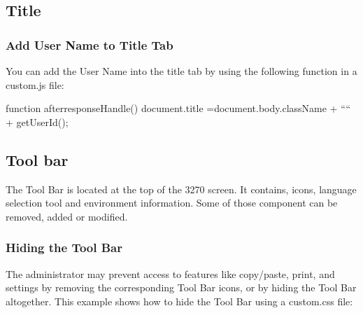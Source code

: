 \documentclass[letterpaper,10pt,english]{sphinxmanual}
\begin{document}


\subsection{Title}
\label{\detokenize{Customization:title}}
\ignorespaces 

\subsubsection{Add User Name to Title Tab}
\label{\detokenize{Customization:add-user-name-to-title-tab}}\label{\detokenize{Customization:index-16}}
You can add the User Name into the title tab by using the following function in a custom.js file:

\begin{sphinxVerbatim}[commandchars=\\\{\}]
function after\PYGZus{}responseHandle() \PYGZob{}
    document.title =document.body.className + “\PYGZhy{}“ + getUserId();
\PYGZcb{}
\end{sphinxVerbatim}



\subsection{Tool bar}
\label{\detokenize{Customization:tool-bar}}
The Tool Bar is located at the top of the 3270 screen. It contains, icons, language selection tool and environment
information. Some of those component can be removed, added or modified.

\ignorespaces 

\subsubsection{Hiding the Tool Bar}
\label{\detokenize{Customization:hiding-the-tool-bar}}\label{\detokenize{Customization:index-17}}
The administrator may prevent access to features like copy/paste, print, and settings by removing the corresponding Tool Bar icons, or by hiding the Tool Bar altogether. This example shows how to hide the Tool Bar using a custom.css file:
\end{document}
